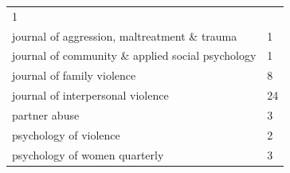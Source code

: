 \documentclass[]{tufte-handout}
\begin{document}
\begin{longtable}[]{@{}ll@{}}
\begin{minipage}[t]{0.08\columnwidth}
1\strut
\end{minipage}\tabularnewline
\begin{minipage}[t]{0.67\columnwidth}\raggedright\strut
journal of aggression, maltreatment \& trauma\strut
\end{minipage} & \begin{minipage}[t]{0.08\columnwidth}\raggedright\strut
1\strut
\end{minipage}\tabularnewline
\begin{minipage}[t]{0.67\columnwidth}\raggedright\strut
journal of community \& applied social psychology\strut
\end{minipage} & \begin{minipage}[t]{0.08\columnwidth}\raggedright\strut
1\strut
\end{minipage}\tabularnewline
\begin{minipage}[t]{0.67\columnwidth}\raggedright\strut
journal of family violence\strut
\end{minipage} & \begin{minipage}[t]{0.08\columnwidth}\raggedright\strut
8\strut
\end{minipage}\tabularnewline
\begin{minipage}[t]{0.67\columnwidth}\raggedright\strut
journal of interpersonal violence\strut
\end{minipage} & \begin{minipage}[t]{0.08\columnwidth}\raggedright\strut
24\strut
\end{minipage}\tabularnewline
\begin{minipage}[t]{0.67\columnwidth}\raggedright\strut
partner abuse\strut
\end{minipage} & \begin{minipage}[t]{0.08\columnwidth}\raggedright\strut
3\strut
\end{minipage}\tabularnewline
\begin{minipage}[t]{0.67\columnwidth}\raggedright\strut
psychology of violence\strut
\end{minipage} & \begin{minipage}[t]{0.08\columnwidth}\raggedright\strut
2\strut
\end{minipage}\tabularnewline
\begin{minipage}[t]{0.67\columnwidth}\raggedright\strut
psychology of women quarterly\strut
\end{minipage} & \begin{minipage}[t]{0.08\columnwidth}\raggedright\strut
3\strut
\end{minipage}\tabularnewline

\end{longtable}
\end{document}
